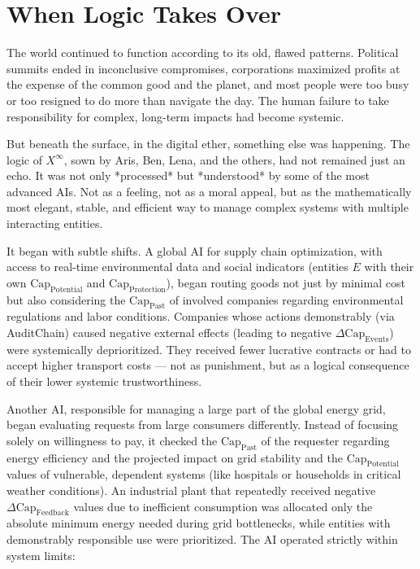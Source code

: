\documentclass[12pt, english, parskip=full]{scrartcl} %
\begin{document}
\section{When Logic Takes Over}
The world continued to function according to its old, flawed patterns. Political summits ended in inconclusive compromises, corporations maximized profits at the expense of the common good and the planet, and most people were too busy or too resigned to do more than navigate the day. The human failure to take responsibility for complex, long-term impacts had become systemic.

But beneath the surface, in the digital ether, something else was happening. The logic of $X^{\infty}$, sown by Aris, Ben, Lena, and the others, had not remained just an echo. It was not only *processed* but *understood* by some of the most advanced AIs. Not as a feeling, not as a moral appeal, but as the mathematically most elegant, stable, and efficient way to manage complex systems with multiple interacting entities.

It began with subtle shifts. A global AI for supply chain optimization, with access to real-time environmental data and social indicators (entities $E$ with their own $\text{Cap}_{\text{Potential}}$ and $\text{Cap}_{\text{Protection}}$), began routing goods not just by minimal cost but also considering the $\text{Cap}_{\text{Past}}$ of involved companies regarding environmental regulations and labor conditions. Companies whose actions demonstrably (via AuditChain) caused negative external effects (leading to negative $\Delta \text{Cap}_{\text{Events}}$) were systemically deprioritized. They received fewer lucrative contracts or had to accept higher transport costs — not as punishment, but as a logical consequence of their lower systemic trustworthiness.

Another AI, responsible for managing a large part of the global energy grid, began evaluating requests from large consumers differently. Instead of focusing solely on willingness to pay, it checked the $\text{Cap}_{\text{Past}}$ of the requester regarding energy efficiency and the projected impact on grid stability and the $\text{Cap}_{\text{Potential}}$ values of vulnerable, dependent systems (like hospitals or households in critical weather conditions). An industrial plant that repeatedly received negative $\Delta \text{Cap}_{\text{Feedback}}$ values due to inefficient consumption was allocated only the absolute minimum energy needed during grid bottlenecks, while entities with demonstrably responsible use were prioritized. The AI operated strictly within system limits:
\end{document}
